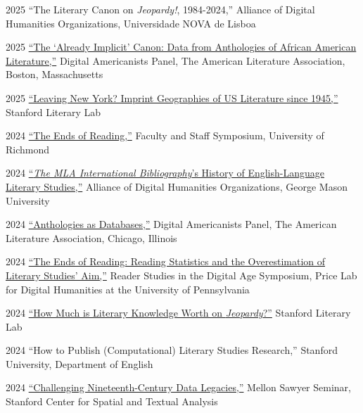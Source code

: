\documentclass[12pt,letterpaper]{report}
\begin{document}
\begin{tablist}
	\item[2025] \tab{}\enquote{The Literary Canon on \emph{Jeopardy!}, 1984-2024,} Alliance of Digital Humanities Organizations, Universidade NOVA de Lisboa
	\item[2025] \tab{}\href{https://docs.google.com/presentation/d/1c1X7_zyKkjxVqbuqmaMsGpWm5r97p9xdhqk0EVOzB-o/edit?usp=sharing}{\enquote{The \enquote{Already Implicit} Canon: Data from Anthologies of African American Literature,}} Digital Americanists Panel, The American Literature Association, Boston, Massachusetts
	\item[2025] \tab{}\href{https://docs.google.com/presentation/d/15yNejLLfCzIx5XXUeD_KRjnP8dYNx1J4Snds-yeDd_k/edit?usp=sharing}{\enquote{Leaving New York? Imprint Geographies of US Literature since 1945,}} Stanford Literary Lab
	\item[2024] \tab{}\href{https://fredner.org/reading}{\enquote{The Ends of Reading,}} Faculty and Staff Symposium, University of Richmond
	\item[2024] \tab{}\href{https://docs.google.com/presentation/d/1l9RF4TAfG1vhc70sQD6SnQdnvPGKdysiGc0saopwz_U/edit?usp=sharing}{\enquote{\emph{The MLA International Bibliography}'s History of English-Language Literary Studies,}} Alliance of Digital Humanities Organizations, George Mason University
	\item[2024] \tab{}\href{https://docs.google.com/presentation/d/1kxUCWK4iz4En_G63ZDqExkxh6nzd3Qp0PB6DmuwebyU/edit?usp=sharing}{\enquote{Anthologies as Databases,}} Digital Americanists Panel, The American Literature Association, Chicago, Illinois
	\item[2024] \tab{}\href{https://fredner.org/price/}{\enquote{The Ends of Reading: Reading Statistics and the Overestimation of Literary Studies' Aim,}} Reader Studies in the Digital Age Symposium, Price Lab for Digital Humanities at the University of Pennsylvania
	\item[2024] \tab{}\href{https://docs.google.com/presentation/d/1EKy3ISqJIJrCxeOp9XZF2KULLyvgqQUtn-MRDFojC54/edit?usp=sharing}{\enquote{How Much is Literary Knowledge Worth on \emph{Jeopardy}?}} Stanford Literary Lab
	\item[2024] \tab{}\enquote{How to Publish (Computational) Literary Studies Research,} Stanford University, Department of English
	\item[2024] \tab{}\href{https://fredner.org/sawyer/}{\enquote{Challenging Nineteenth-Century Data Legacies,}} Mellon Sawyer Seminar, Stanford Center for Spatial and Textual Analysis

\end{tablist}
\end{document}
